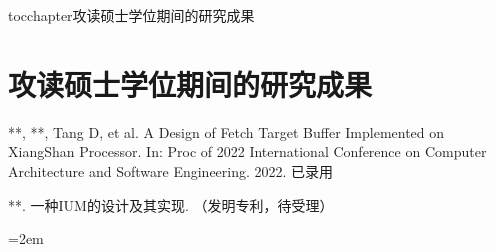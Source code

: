
\newenvironment{thepublications}{\wuhao\song}

\addcontentsline{toc}{chapter}{攻读硕士学位期间的研究成果}%
\chapter*{\centering\xiaosan\hei\bfseries 攻读硕士学位期间的研究成果}

\begin{thepublications}

\setlength{\parindent}{0em}
\begin{publist}
	\item ***, **, Tang D, et al. A Design of Fetch Target Buffer Implemented on XiangShan Processor. In: Proc of 2022 International Conference on Computer Architecture and Software Engineering. 2022. 已录用
	\item ***. 一种IUM的设计及其实现. （发明专利，待受理）
\end{publist}

\vfill
{}\hangindent=2em\noindent

\setlength{\parindent}{2em}

\end{thepublications}

